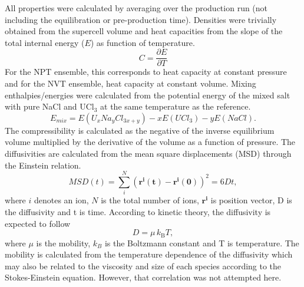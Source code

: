 \documentclass[preprint,3p,10pt,twocolumn,number,sort&compress]{elsarticle}
\begin{document}

All properties were calculated by averaging over the production run (not including the equilibration or pre-production time). Densities were trivially obtained from the supercell volume and heat capacities from the slope of the total internal energy ($E$) as function of temperature. 
\begin{equation}
C=\frac{\partial E}{\partial T}
\end{equation}
For the NPT ensemble, this corresponds to heat capacity at constant pressure and for the NVT ensemble, heat capacity at constant volume. Mixing enthalpies/energies were calculated from the potential energy of the mixed salt with pure NaCl and UCl$_3$ at the same temperature as the reference. 
\begin{equation}
E_{mix}=E(U_xNa_yCl_{3x+y})-xE(UCl_3)-yE(NaCl).
\end{equation}
The compressibility is calculated as the negative of the inverse equilibrium volume multiplied by the derivative of the volume as a function of pressure. The diffusivities are calculated from the mean square displacements (MSD) through the Einstein relation.
\begin{equation}
MSD(t)=\sum_i^N (\mathbf{r^i(t)} - \mathbf{r^i(0)})^2 =6Dt,
\end{equation}
where $i$ denotes an ion, $N$ is the total number of ions, $\mathbf{r^i}$ is position vector, D is the diffusivity and t is time. According to kinetic theory, the diffusivity is expected to follow
\begin{equation}
D=\mu \,k_{\text{B}}T,
\end{equation}
where $\mu$ is the mobility, $k_B$ is the Boltzmann constant and T is temperature. The mobility is calculated from the temperature dependence of the diffusivity which may also be related to the viscosity and size of each species according to the Stokes-Einstein equation. However, that correlation was not attempted here.
\end{document}
